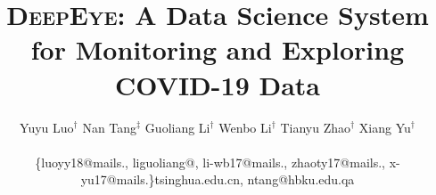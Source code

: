 \documentclass[11pt]{article}
\begin{document}
\title{\textsc{DeepEye}: A Data Science System for Monitoring and Exploring COVID-19 Data}

\author{ \hspace{-1em} \alignauthor 
	Yuyu Luo$^{\dag}$\hspace{1em}
	Nan Tang$^{\ddag}$\hspace{1em} 
	Guoliang Li$^{\dag}$\hspace{1em}
	Wenbo Li$^{\dag}$\hspace{1em}
	Tianyu Zhao$^{\dag}$\hspace{1em}
	Xiang Yu$^{\dag}$
	\\
 \\
\hspace{-1em}
	{\small \{luoyy18@mails., liguoliang@, li-wb17@mails., zhaoty17@mails., x-yu17@mails.\}tsinghua.edu.cn, ntang@hbku.edu.qa}
}
\maketitle










% 
%   
\end{document}
